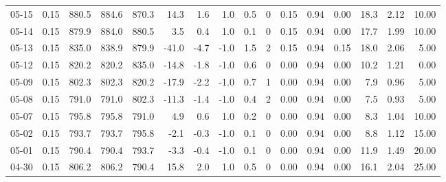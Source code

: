 \begin{threeparttable}
{\begin{tabular}{lrrrrrrrrrrrrrrr}
  05-15 &     0.15 & 880.5 & 884.6 & 870.3 &       14.3 &            1.6 &                      1.0 &                 0.5 &              0 &       0.15 &      0.94 &           0.00 &             18.3 &            2.12 &                  10.00 \\
  05-14 &     0.15 & 879.9 & 884.0 & 880.5 &        3.5 &            0.4 &                      1.0 &                 0.1 &              0 &       0.15 &      0.94 &           0.00 &             17.7 &            1.99 &                  10.00 \\
  05-13 &     0.15 & 835.0 & 838.9 & 879.9 &      -41.0 &           -4.7 &                     -1.0 &                 1.5 &              2 &       0.15 &      0.94 &           0.15 &             18.0 &            2.06 &                   5.00 \\
  05-12 &     0.15 & 820.2 & 820.2 & 835.0 &      -14.8 &           -1.8 &                     -1.0 &                 0.6 &              0 &       0.00 &      0.94 &           0.00 &             10.2 &            1.21 &                   0.00 \\
  05-09 &     0.15 & 802.3 & 802.3 & 820.2 &      -17.9 &           -2.2 &                     -1.0 &                 0.7 &              1 &       0.00 &      0.94 &           0.00 &              7.9 &            0.96 &                   5.00 \\
  05-08 &     0.15 & 791.0 & 791.0 & 802.3 &      -11.3 &           -1.4 &                     -1.0 &                 0.4 &              2 &       0.00 &      0.94 &           0.00 &              7.5 &            0.93 &                   5.00 \\
  05-07 &     0.15 & 795.8 & 795.8 & 791.0 &        4.9 &            0.6 &                      1.0 &                 0.2 &              0 &       0.00 &      0.94 &           0.00 &              8.3 &            1.04 &                  10.00 \\
  05-02 &     0.15 & 793.7 & 793.7 & 795.8 &       -2.1 &           -0.3 &                     -1.0 &                 0.1 &              0 &       0.00 &      0.94 &           0.00 &              8.8 &            1.12 &                  15.00 \\
  05-01 &     0.15 & 790.4 & 790.4 & 793.7 &       -3.3 &           -0.4 &                     -1.0 &                 0.1 &              0 &       0.00 &      0.94 &           0.00 &             11.9 &            1.49 &                  20.00 \\
  04-30 &     0.15 & 806.2 & 806.2 & 790.4 &       15.8 &            2.0 &                      1.0 &                 0.5 &              0 &       0.00 &      0.94 &           0.00 &             16.1 &            2.04 &                  25.00 \\

\end{tabular}}
\end{threeparttable}
